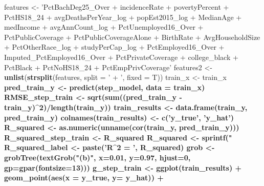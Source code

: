 \documentclass[
  11pt,
]{article}
\newenvironment{Shaded}{\begin{snugshade}}{\end{snugshade}}
\newcommand{\DataTypeTok}[1]{\textcolor[rgb]{0.13,0.29,0.53}{#1}}
\newcommand{\DecValTok}[1]{\textcolor[rgb]{0.00,0.00,0.81}{#1}}
\newcommand{\FloatTok}[1]{\textcolor[rgb]{0.00,0.00,0.81}{#1}}
\newcommand{\KeywordTok}[1]{\textcolor[rgb]{0.13,0.29,0.53}{\textbf{#1}}}
\newcommand{\NormalTok}[1]{#1}
\newcommand{\OperatorTok}[1]{\textcolor[rgb]{0.81,0.36,0.00}{\textbf{#1}}}
\newcommand{\StringTok}[1]{\textcolor[rgb]{0.31,0.60,0.02}{#1}}
\begin{document}
\begin{Shaded}
\begin{Highlighting}[]
{{{{{{{{{{{{{{{{{{{{{{{{{{{{{{{{{{{{{{{{{{{{{{{{{{{{{{{{{{{{{{{{{{{{\NormalTok{features <-}\StringTok{ 'PctBachDeg25_Over + incidenceRate + povertyPercent + PctHS18_24 + avgDeathsPerYear_log + popEst2015_log + MedianAge + medIncome + avgAnnCount_log + PctUnemployed16_Over + PctPublicCoverage + PctPublicCoverageAlone + BirthRate + AvgHouseholdSize + PctOtherRace_log + studyPerCap_log + PctEmployed16_Over + Imputed_PctEmployed16_Over + PctPrivateCoverage + college_black + PctBlack + PctNoHS18_24 + PctEmpPrivCoverage'}
\NormalTok{features2 <-}\StringTok{ }\KeywordTok{unlist}\NormalTok{(}\KeywordTok{strsplit}\NormalTok{(features, }\DataTypeTok{split =} \StringTok{' + '}\NormalTok{, }\DataTypeTok{fixed =}\NormalTok{ T))}
\NormalTok{train_x <-}\StringTok{ }\NormalTok{train_x }\OperatorTok{%
\NormalTok{pred_train_y <-}\StringTok{ }\KeywordTok{predict}\NormalTok{(step_model, }\DataTypeTok{data =}\NormalTok{ train_x)}
\NormalTok{RMSE_step_train <-}\StringTok{ }\KeywordTok{sqrt}\NormalTok{(}\KeywordTok{sum}\NormalTok{((pred_train_y }\OperatorTok{-}\StringTok{ }\NormalTok{train_y)}\OperatorTok{^}\DecValTok{2}\NormalTok{)}\OperatorTok{/}\KeywordTok{length}\NormalTok{(train_y))}
\NormalTok{train_results <-}\StringTok{ }\KeywordTok{data.frame}\NormalTok{(train_y, pred_train_y)}
\KeywordTok{colnames}\NormalTok{(train_results) <-}\StringTok{ }\KeywordTok{c}\NormalTok{(}\StringTok{'y_true'}\NormalTok{, }\StringTok{'y_hat'}\NormalTok{)}
\NormalTok{R_squared <-}\StringTok{ }\KeywordTok{as.numeric}\NormalTok{(}\KeywordTok{unname}\NormalTok{(}\KeywordTok{cor}\NormalTok{(train_y, pred_train_y)))}
\NormalTok{R_squared_step_train <-}\StringTok{ }\NormalTok{R_squared}
\NormalTok{R_squared <-}\StringTok{ }\KeywordTok{sprintf}\NormalTok{(}\StringTok{"%
\NormalTok{R_squared_label <-}\StringTok{ }\KeywordTok{paste}\NormalTok{(}\StringTok{'R^2 = '}\NormalTok{, R_squared)}
\NormalTok{grob <-}\StringTok{ }\KeywordTok{grobTree}\NormalTok{(}\KeywordTok{textGrob}\NormalTok{(}\StringTok{"(b)"}\NormalTok{, }\DataTypeTok{x=}\FloatTok{0.01}\NormalTok{,  }\DataTypeTok{y=}\FloatTok{0.97}\NormalTok{, }\DataTypeTok{hjust=}\DecValTok{0}\NormalTok{,}
  \DataTypeTok{gp=}\KeywordTok{gpar}\NormalTok{(}\DataTypeTok{fontsize=}\DecValTok{13}\NormalTok{)))}
\NormalTok{g_step_train <-}\StringTok{ }\KeywordTok{ggplot}\NormalTok{(train_results) }\OperatorTok{+}\StringTok{ }
\StringTok{  }\KeywordTok{geom_point}\NormalTok{(}\KeywordTok{aes}\NormalTok{(}\DataTypeTok{x =}\NormalTok{ y_true, }\DataTypeTok{y=}\NormalTok{ y_hat)) }\OperatorTok{+}\StringTok{ }
}}}}}}}}}}}}}}}}}}}}}}}}}}}}}}}}}}}}}}}}}}}}}}}}}}}}}}}}}}}}}}}}}}}}}}
\end{Highlighting}
\end{Shaded}
\end{document}
